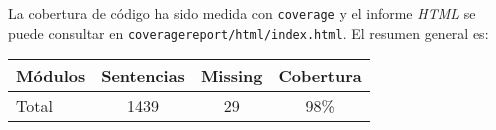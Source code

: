 La cobertura de código ha sido medida con \texttt{coverage} y el informe \textit{HTML} se puede consultar en \texttt{coveragereport/html/index.html}. El resumen general es:

\begin{center}
\begin{tabular}{lccc}
\toprule
\textbf{Módulos} & \textbf{Sentencias} & \textbf{Missing} & \textbf{Cobertura} \\
\midrule
Total            & 1439                & 29              & 98\%               \\
\bottomrule
\end{tabular}
\end{center}

